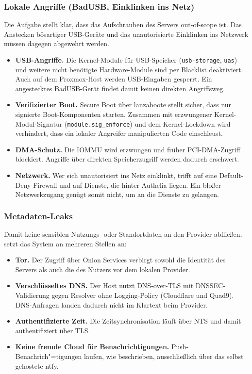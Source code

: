 \subsubsection{Lokale Angriffe (Bad\ac{USB}, Einklinken ins Netz)}

Die Aufgabe stellt klar, dass das Aufschrauben des Servers out-of-scope ist.
Das Anstecken bösartiger \ac{USB}-Geräte und das unautorisierte Einklinken
ins Netzwerk müssen dagegen abgewehrt werden.

\begin{itemize}
  \item \textbf{\ac{USB}-Angriffe.} Die Kernel-Module für \ac{USB}-Speicher
    (\texttt{usb-storage}, \texttt{uas}) und weitere nicht benötigte
    Hardware-Module sind per Blacklist deaktiviert. Auch auf dem
    Proxmox-Host werden \ac{USB}-Eingaben gesperrt. Ein angestecktes
    Bad\ac{USB}-Gerät findet damit keinen direkten Angriffsweg.
  \item \textbf{Verifizierter Boot.} Secure Boot über lanzaboote stellt
    sicher, dass nur signierte Boot-Komponenten starten. Zusammen mit
    erzwungener Kernel-Modul-Signatur (\texttt{module.sig\_enforce}) und dem
    Kernel-Lockdown wird verhindert, dass ein lokaler Angreifer manipulierten
    Code einschleust.
  \item \textbf{\ac{DMA}-Schutz.} Die \ac{IOMMU} wird erzwungen und früher
    \ac{PCI}-\ac{DMA}-Zugriff blockiert. Angriffe über direkten
    Speicherzugriff werden dadurch erschwert.
  \item \textbf{Netzwerk.} Wer sich unautorisiert ins Netz einklinkt, trifft
    auf eine Default-Deny-Firewall und auf Dienste, die hinter Authelia
    liegen. Ein bloßer Netzwerkzugang genügt somit nicht, um an die Dienste
    zu gelangen.
\end{itemize}

\subsubsection{Metadaten-Leaks}

Damit keine sensiblen Nutzungs- oder Standortdaten an den Provider abfließen,
setzt das System an mehreren Stellen an:

\begin{itemize}
  \item \textbf{Tor.} Der Zugriff über Onion Services verbirgt sowohl die
    Identität des Servers als auch die des Nutzers vor dem lokalen Provider.
  \item \textbf{Verschlüsseltes \ac{DNS}.} Der Host nutzt
    \ac{DNS}-over-\ac{TLS} mit \ac{DNSSEC}-Validierung gegen Resolver ohne
    Logging-Policy (Cloudflare und Quad9). \ac{DNS}-Anfragen landen dadurch
    nicht im Klartext beim Provider.
  \item \textbf{Authentifizierte Zeit.} Die Zeitsynchronisation läuft über
    \ac{NTS} und damit authentifiziert über \ac{TLS}.
  \item \textbf{Keine fremde Cloud für Benachrichtigungen.}
    Push-Benachrich"=tigungen laufen, wie beschrieben, ausschließlich über das
    selbst gehostete ntfy.
\end{itemize}


